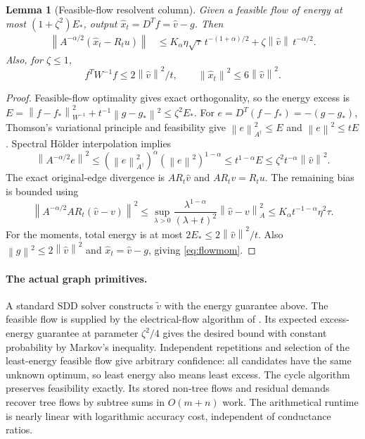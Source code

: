 \documentclass[11pt]{article}
\newtheorem{lemma}[theorem]{Lemma}
\newcommand{\norm}[1]{\left\lVert#1\right\rVert}
\begin{document}
\begin{lemma}[Feasible-flow resolvent column]\label{lem:flow}
Given a feasible flow of energy at most $(1+\zeta^2)E_*$, output
$\widehat x_t=D^Tf=\widehat v-g$. Then
\begin{align}
 \norm{A^{-\alpha/2}(\widehat x_t-R_tu)}
 &\le K_\alpha\eta\sqrt\tau\,t^{-(1+\alpha)/2}
       +\zeta\norm{\widehat v}\,t^{-\alpha/2}.\label{eq:flowerr}
\end{align}
Also, for $\zeta\le1$,
\begin{equation}\label{eq:flowmom}
 f^TW^{-1}f\le2\norm{\widehat v}^2/t,
 \qquad \norm{\widehat x_t}^2\le6\norm{\widehat v}^2.
\end{equation}
\end{lemma}
\begin{proof}
Feasible-flow optimality gives exact orthogonality, so the energy excess
is
$E=\norm{f-f_*}_{W^{-1}}^2+t^{-1}\norm{g-g_*}^2\le\zeta^2E_*$.
For $e=D^T(f-f_*)=-(g-g_*)$, Thomson's variational principle and
feasibility give $\norm e_{A^\dagger}^2\le E$ and
$\norm e^2\le tE$. Spectral H\"older interpolation implies
\[
 \norm{A^{-\alpha/2}e}^2
 \le(\norm e_{A^\dagger}^2)^\alpha(\norm e^2)^{1-\alpha}
 \le t^{1-\alpha}E
 \le\zeta^2t^{-\alpha}\norm{\widehat v}^2.
\]
The exact original-edge divergence is $A R_t\widehat v$ and
$A R_t v=R_tu$. The remaining bias is bounded using
\[
 \norm{A^{-\alpha/2}A R_t(\widehat v-v)}^2
 \le\sup_{\lambda>0}
 \frac{\lambda^{1-\alpha}}{(\lambda+t)^2}
 \norm{\widehat v-v}_A^2
 \le K_\alpha t^{-1-\alpha}\eta^2\tau.
\]
For the moments, total energy is at most
$2E_*\le2\norm{\widehat v}^2/t$.
Also $\norm g^2\le2\norm{\widehat v}^2$ and
$\widehat x_t=\widehat v-g$, giving \eqref{eq:flowmom}.
\end{proof}

\paragraph{The actual graph primitives.}
A standard SDD solver constructs $\widetilde v$ with the energy
guarantee above. The feasible flow is supplied by the electrical-flow
algorithm of \cite[Definition 2.4, Theorems 3.2 and 4.1]{KOSZ}.
Its expected excess-energy guarantee at parameter $\zeta^2/4$ gives
the desired bound with constant probability by Markov's inequality.
Independent repetitions and selection of the least-energy feasible
flow give arbitrary confidence: all candidates have the same unknown
optimum, so least energy also means least excess. The cycle algorithm
preserves feasibility exactly. Its stored non-tree flows and residual
demands recover tree flows by subtree sums in $O(m+n)$ work. The
arithmetical runtime is nearly linear with logarithmic accuracy cost,
independent of conductance ratios.
\end{document}
